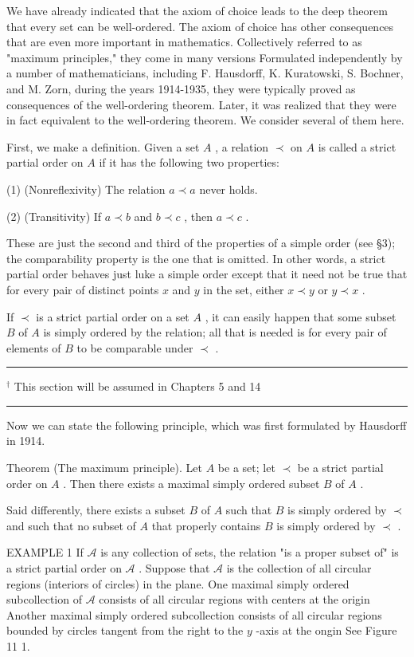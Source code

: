 \documentclass[10pt]{article}
\newcommand{\HRule}{\begin{center}\rule{0.9\linewidth}{0.2mm}\end{center}}
\begin{document}
We have already indicated that the axiom of choice leads to the deep theorem that every set can be well-ordered. The axiom of choice has other consequences that are even more important in mathematics. Collectively referred to as "maximum principles," they come in many versions Formulated independently by a number of mathematicians, including F. Hausdorff, K. Kuratowski, S. Bochner, and M. Zorn, during the years 1914-1935, they were typically proved as consequences of the well-ordering theorem. Later, it was realized that they were in fact equivalent to the well-ordering theorem. We consider several of them here.

First, we make a definition. Given a set \(A\) , a relation \(\prec\) on \(A\) is called a strict partial order on \(A\) if it has the following two properties:

(1) (Nonreflexivity) The relation \(a \prec  a\) never holds.

(2) (Transitivity) If \(a \prec  b\) and \(b \prec  c\) , then \(a \prec  c\) .

These are just the second and third of the properties of a simple order (see §3); the comparability property is the one that is omitted. In other words, a strict partial order behaves just luke a simple order except that it need not be true that for every pair of distinct points \(x\) and \(y\) in the set, either \(x \prec  y\) or \(y \prec  x\) .

If \(\prec\) is a strict partial order on a set \(A\) , it can easily happen that some subset \(B\) of \(A\) is simply ordered by the relation; all that is needed is for every pair of elements of \(B\) to be comparable under \(\prec\) .

\HRule

\({}^{ \dagger  }\) This section will be assumed in Chapters 5 and 14

\HRule

Now we can state the following principle, which was first formulated by Hausdorff in 1914.

Theorem (The maximum principle). Let \(A\) be a set; let \(\prec\) be a strict partial order on \(A\) . Then there exists a maximal simply ordered subset \(B\) of \(A\) .

Said differently, there exists a subset \(B\) of \(A\) such that \(B\) is simply ordered by \(\prec\) and such that no subset of \(A\) that properly contains \(B\) is simply ordered by \(\prec\) .

EXAMPLE 1 If \(\mathcal{A}\) is any collection of sets, the relation "is a proper subset of" is a strict partial order on \(\mathcal{A}\) . Suppose that \(\mathcal{A}\) is the collection of all circular regions (interiors of circles) in the plane. One maximal simply ordered subcollection of \(\mathcal{A}\) consists of all circular regions with centers at the origin Another maximal simply ordered subcollection consists of all circular regions bounded by circles tangent from the right to the \(y\) -axis at the ongin See Figure 11 1.
\end{document}
